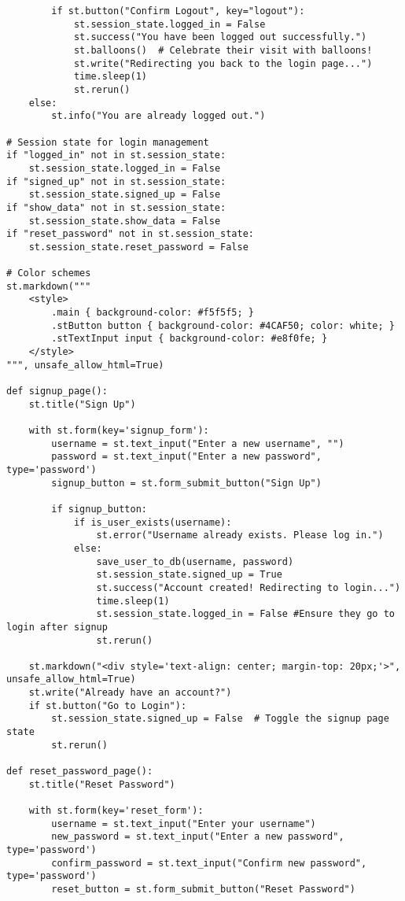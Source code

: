 \documentclass[10pt]{report}
\begin{document}
\begin{center}
\begin{lstlisting}
        if st.button("Confirm Logout", key="logout"):
            st.session_state.logged_in = False  
            st.success("You have been logged out successfully.")
            st.balloons()  # Celebrate their visit with balloons!
            st.write("Redirecting you back to the login page...")
            time.sleep(1)
            st.rerun()
    else:
        st.info("You are already logged out.")

# Session state for login management
if "logged_in" not in st.session_state:
    st.session_state.logged_in = False
if "signed_up" not in st.session_state:
    st.session_state.signed_up = False
if "show_data" not in st.session_state:
    st.session_state.show_data = False
if "reset_password" not in st.session_state:
    st.session_state.reset_password = False

# Color schemes
st.markdown("""
    <style>
        .main { background-color: #f5f5f5; }
        .stButton button { background-color: #4CAF50; color: white; }
        .stTextInput input { background-color: #e8f0fe; }
    </style>
""", unsafe_allow_html=True)

def signup_page():
    st.title("Sign Up")

    with st.form(key='signup_form'):
        username = st.text_input("Enter a new username", "")
        password = st.text_input("Enter a new password", type='password')
        signup_button = st.form_submit_button("Sign Up")

        if signup_button:
            if is_user_exists(username):
                st.error("Username already exists. Please log in.")
            else:
                save_user_to_db(username, password)
                st.session_state.signed_up = True
                st.success("Account created! Redirecting to login...")
                time.sleep(1)
                st.session_state.logged_in = False #Ensure they go to login after signup
                st.rerun()

    st.markdown("<div style='text-align: center; margin-top: 20px;'>", unsafe_allow_html=True)
    st.write("Already have an account?")
    if st.button("Go to Login"):
        st.session_state.signed_up = False  # Toggle the signup page state
        st.rerun()

def reset_password_page():
    st.title("Reset Password")

    with st.form(key='reset_form'):
        username = st.text_input("Enter your username")
        new_password = st.text_input("Enter a new password", type='password')
        confirm_password = st.text_input("Confirm new password", type='password')
        reset_button = st.form_submit_button("Reset Password")


\end{lstlisting}
\end{center}
\end{document}
